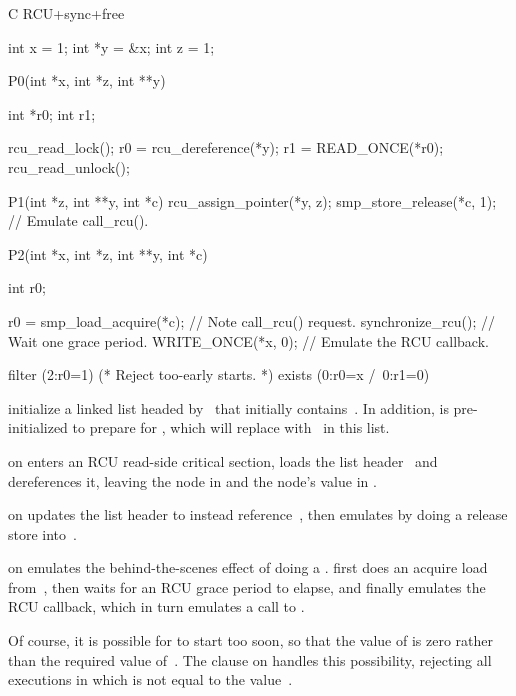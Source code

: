 \begin{fcvlabel}
\begin{VerbatimN}[commandchars=\%\@\$]
	C RCU+sync+free

	{
	int x = 1;      %
	int *y = &x;
	int z = 1;      %
	}

	P0(int *x, int *z, int **y)    %
	{
		int *r0;
		int r1;

		rcu_read_lock();
		r0 = rcu_dereference(*y);
		r1 = READ_ONCE(*r0);
		rcu_read_unlock();
	}                              %

	P1(int *z, int **y, int *c)    %
	{
		rcu_assign_pointer(*y, z);
		smp_store_release(*c, 1); // Emulate call_rcu().
	}                              %

	P2(int *x, int *z, int **y, int *c)   %
	{
		int r0;

		r0 = smp_load_acquire(*c); // Note call_rcu() request.  %
		synchronize_rcu(); // Wait one grace period.  %
		WRITE_ONCE(*x, 0); // Emulate the RCU callback.  %
	}                                     %

	filter (2:r0=1) (* Reject too-early starts. *)  %
	exists (0:r0=x /\ 0:r1=0)
\end{VerbatimN}
\end{fcvlabel}

\begin{fcvref}
 initialize a linked list headed by~
that initially contains~.
In addition,  is pre-initialized to prepare for , which
will replace  with~ in this list.

 on  enters an RCU read-side critical
section, loads the list header~ and dereferences it, leaving the
node in  and the node's value in .

 on  updates the list header to instead
reference~, then emulates  by doing a release store
into~.

 on  emulates the behind-the-scenes effect
of doing a .
 first does an acquire load from~, then 
waits for an RCU grace period to elapse, and finally  emulates
the RCU callback, which in turn emulates a call to .

Of course, it is possible for  to start too soon, so that the
value of  is zero rather than the required value of~.
The  clause on  handles this possibility, rejecting
all executions in which  is not equal to the value~.
\end{fcvref}


